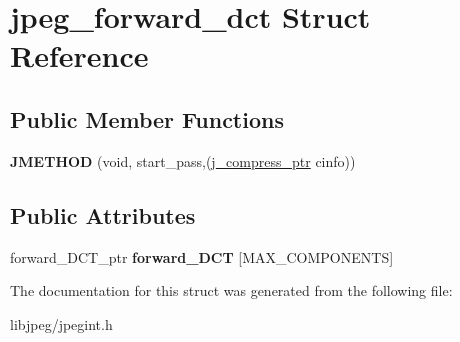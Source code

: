 \hypertarget{structjpeg__forward__dct}{\section{jpeg\-\_\-forward\-\_\-dct Struct Reference}
\label{structjpeg__forward__dct}
}
\subsection*{Public Member Functions}
\begin{DoxyCompactItemize}
\item 
\hypertarget{structjpeg__forward__dct_a51b3b61e60becc93a36b41e26fd2c616}{{\bfseries J\-M\-E\-T\-H\-O\-D} (void, start\-\_\-pass,(\hyperlink{structjpeg__compress__struct}{j\-\_\-compress\-\_\-ptr} cinfo))}\label{structjpeg__forward__dct_a51b3b61e60becc93a36b41e26fd2c616}

\end{DoxyCompactItemize}
\subsection*{Public Attributes}
\begin{DoxyCompactItemize}
\item 
\hypertarget{structjpeg__forward__dct_a227dc1b935c81ac94fc81521be709faf}{forward\-\_\-\-D\-C\-T\-\_\-ptr {\bfseries forward\-\_\-\-D\-C\-T} \mbox{[}M\-A\-X\-\_\-\-C\-O\-M\-P\-O\-N\-E\-N\-T\-S\mbox{]}}\label{structjpeg__forward__dct_a227dc1b935c81ac94fc81521be709faf}

\end{DoxyCompactItemize}


The documentation for this struct was generated from the following file\-:\begin{DoxyCompactItemize}
\item 
libjpeg/jpegint.\-h\end{DoxyCompactItemize}
